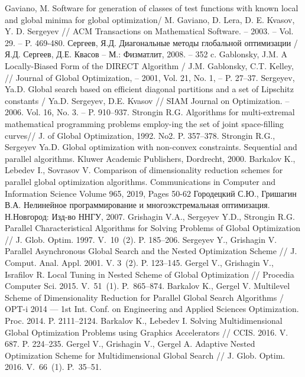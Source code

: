 \documentclass{svproc}
\begin{document}
\begin{thebibliography}{6}
	Gaviano, M. Software for generation of classes of test functions with known local and global minima for global optimization/ M. Gaviano, D. Lera, D. E. Kvasov, Y. D. Sergeyev // ACM Transactions on Mathematical Software. – 2003. – Vol.  29. – P. 469-480.
	Сергеев, Я.Д. Диагональные методы глобальной оптимизации / Я.Д. Сергеев, Д.Е. Квасов – М.: Физматлит, 2008. – 352 c.
	Gablonsky, J.M. A Locally-Biased Form of the DIRECT Algorithm / J.M.  Gablonsky, C.T. Kelley, // Journal of Global Optimization, – 2001, Vol. 21, No. 1, – P. 27–37.
	Sergeyev, Ya.D. Global search based on efficient diagonal partitions and a set of Lipschitz constants / Ya.D. Sergeyev, D.E. Kvasov // SIAM Journal on Optimization. – 2006. Vol. 16, No. 3. – P. 910–937.
	Strongin R.G. Algorithms for multi-extremal mathematical programming problems employ-ing the set of joint space-filling curves// J. of Global Optimization, 1992. No2. P. 357–378. 
	 Strongin R.G., Sergeyev Ya.D. Global optimization with non-convex constraints. Sequential and parallel algorithms. Kluwer Academic Publishers, Dordrecht, 2000. 
	Barkalov K., Lebedev I., Sovrasov V. Comparison of dimensionality reduction schemes for parallel global optimization algorithms. Communications in Computer and Information Science Volume 965, 2019, Pages 50-62
	Городецкий С.Ю., Гришагин В.А. Нелинейное программирование и многоэкстремальная оптимизация. Н.Новгород: Изд-во ННГУ, 2007.
	Grishagin V.A., Sergeyev Y.D., Strongin R.G. Parallel Characteristical Algorithms for Solving Problems of Global Optimization // J. Glob. Optim. 1997. V.~10~(2). P. 185--206.
	Sergeyev Y., Grishagin V. Parallel Asynchronous Global Search and the Nested Optimization Scheme // J. Comput. Anal. Appl. 2001. V. 3~(2). P. 123--145.
	Gergel V., Grishagin V., Israfilov R. Local Tuning in Nested Scheme of Global Optimization // Procedia Computer Sci. 2015. V.~51~(1). P.~865--874.
	Barkalov K., Gergel V. Multilevel Scheme of Dimensionality Reduction for Parallel Global Search Algorithms / OPT-i 2014 --- 1st Int. Conf. on Engineering and Applied Sciences Optimization. Proc. 2014. P. 2111--2124.
	Barkalov K., Lebedev I. Solving Multidimensional Global Optimization Problems using Graphics Accelerators // CCIS. 2016. V. 687. P. 224--235.
	Gergel V., Grishagin V., Gergel A. Adaptive Nested Optimization Scheme for Multidimensional Global Search // J. Glob. Optim. 2016. V.~66~(1). P.~35--51.

\end{thebibliography}
\end{document}

